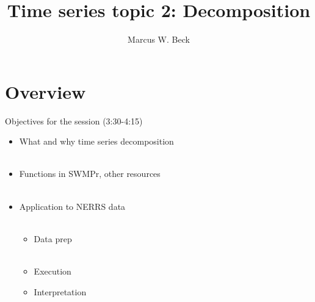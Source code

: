 \documentclass[xcolor=dvipsnames,serif]{beamer}\usepackage[]{graphicx}\usepackage[]{color}
\begin{document}
\title[TS decomposition]{Time series topic 2: Decomposition}

\author[M. Beck]{Marcus W. Beck}

\date{}









\section{Overview}

\begin{frame}{Objectives for the session (3:30-4:15)}
\begin{itemize}
\item What and why time series decomposition \\~\\
\item Functions in SWMPr, other resources \\~\\
\item Application to NERRS data \\~\\
\begin{itemize}
\item Data prep \\~\\
\item Execution
\item Interpretation 
\end{itemize}
\end{itemize}
\end{frame}
\end{document}
